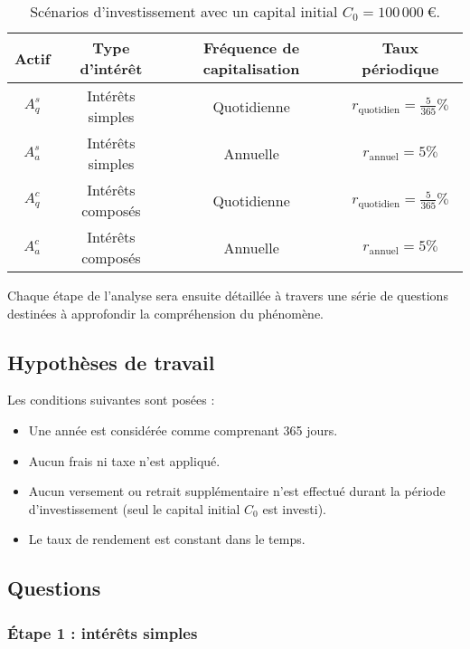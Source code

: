 \documentclass{article}
\begin{document}
\begin{table}[h!]
\centering
\begin{tabular}{|c|c|c|c|}
\hline
\textbf{Actif} & \textbf{Type d'intérêt} & \textbf{Fréquence de capitalisation} & \textbf{Taux périodique} \\
\hline
\(A_q^s\) & Intérêts simples & Quotidienne & \(r_\text{quotidien} = \frac{5}{365}\%\) \\
\hline
\(A_a^s\) & Intérêts simples & Annuelle & \(r_\text{annuel} = 5\%\) \\
\hline
\(A_q^c\) & Intérêts composés & Quotidienne & \(r_\text{quotidien} = \frac{5}{365}\%\) \\
\hline
\(A_a^c\) & Intérêts composés & Annuelle & \(r_\text{annuel} = 5\%\) \\
\hline
\end{tabular}
\caption{Scénarios d'investissement avec un capital initial \(C_0 = 100\,000\ \text{€}\).}
\label{tab:scenarios}
\end{table}

Chaque étape de l'analyse sera ensuite détaillée à travers une série de questions destinées à approfondir la compréhension du phénomène.

\subsection{Hypothèses de travail}
Les conditions suivantes sont posées :
\begin{itemize}
    \item Une année est considérée comme comprenant 365 jours.
    \item Aucun frais ni taxe n'est appliqué.
    \item Aucun versement ou retrait supplémentaire n’est effectué durant la période d'investissement (seul le capital initial \( C_0 \) est investi).
    \item Le taux de rendement est constant dans le temps.
\end{itemize}

\subsection{Questions}
\subsubsection*{Étape 1 : intérêts simples}
\end{document}
